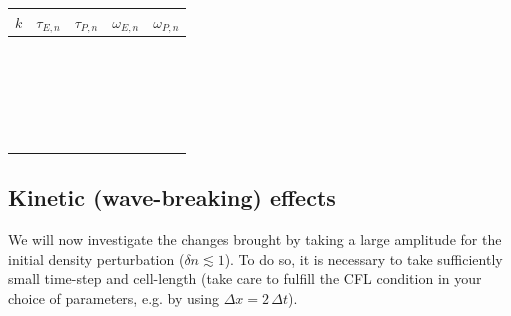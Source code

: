 \documentclass[11pt,a4paper]{article}
\begin{document}
\begin{tabularx}{\textwidth}{X|X|X|X|X}
\Large\textbf{$k$} & \Large\textbf{$\tau_{E,n}$} & \Large\textbf{$\tau_{P,n}$} &  \Large\textbf{$\omega_{E,n}$} & \Large\textbf{$\omega_{P,n}$} \\
\hline
 & & & & \\  & & & & \\ & & & & \\ & & & & \\  & & & & \\ & & & & \\  & & & & \\  & & & & \\ & & & & \\ & & & & \\  & & & & \\ 
 & & & & \\  & & & & \\ & & & & \\ & & & & \\  & & & & \\ & & & & \\  & & & & \\  & & & & \\ & & & & \\ & & & & \\  & & & & \\ 
\end{tabularx}


\subsection*{Kinetic (wave-breaking) effects}

We will now investigate the changes brought by taking a large amplitude for the initial density perturbation ($\delta n \lesssim 1$). To do so, it is necessary to take sufficiently small time-step and cell-length (take care to fulfill the CFL condition in your choice of parameters, e.g. by using $\Delta x = 2\,\Delta t $).
\end{document}
